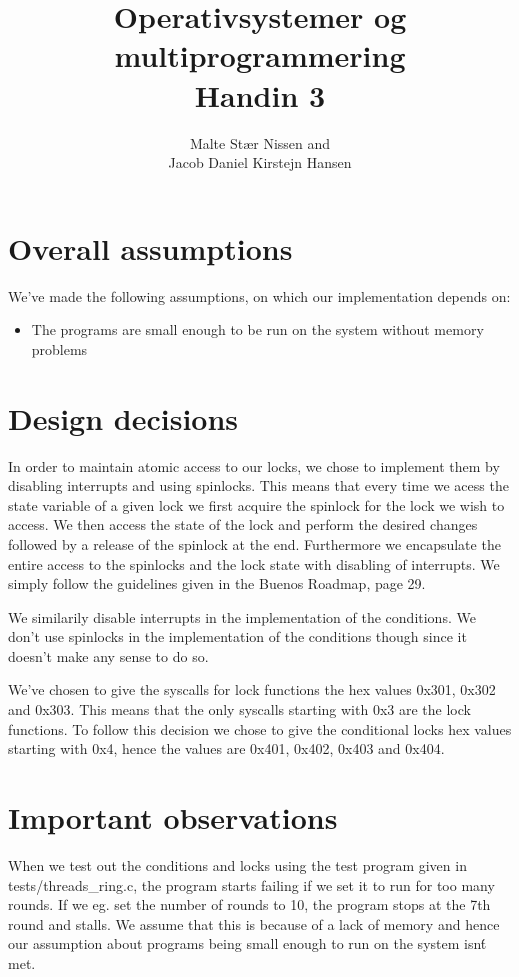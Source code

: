 \documentclass[11pt,a4paper]{article}
\title{Operativsystemer og multiprogrammering \\ Handin 3}
\author{Malte Stær Nissen and \\ 
        Jacob Daniel Kirstejn Hansen}
\begin{document}
\maketitle

\tableofcontents
\newpage

\section{Overall assumptions}
We've made the following assumptions, on which our implementation depends on: 

\begin{itemize}
\item The programs are small enough to be run on the system without memory problems
\end{itemize}

\section{Design decisions}
In order to maintain atomic access to our locks, we chose to implement them by disabling interrupts and using spinlocks. This means that every time we acess the state variable of a given lock we first acquire the spinlock for the lock we wish to access. We then access the state of the lock and perform the desired changes followed by a release of the spinlock at the end. Furthermore we encapsulate the entire access to the spinlocks and the lock state with disabling of interrupts. We simply follow the guidelines given in the Buenos Roadmap, page 29.

We similarily disable interrupts in the implementation of the conditions. We don't use spinlocks in the implementation of the conditions though since it doesn't make any sense to do so.

We've chosen to give the syscalls for lock functions the hex values 0x301,
0x302 and 0x303. This means that the only syscalls starting with 0x3 are the
lock functions. To follow this decision we chose to give the conditional locks
hex values starting with 0x4, hence the values are 0x401, 0x402, 0x403 and
0x404.

\section{Important observations}
When we test out the conditions and locks using the test program given in
tests/threads\_ring.c, the program starts failing if we set it to run for too
many rounds. If we eg. set the number of rounds to 10, the program stops at the
7th round and stalls. We assume that this is because of a lack of memory and
hence our assumption about programs being small enough to run on the system
isn\'t met.
\end{document}
